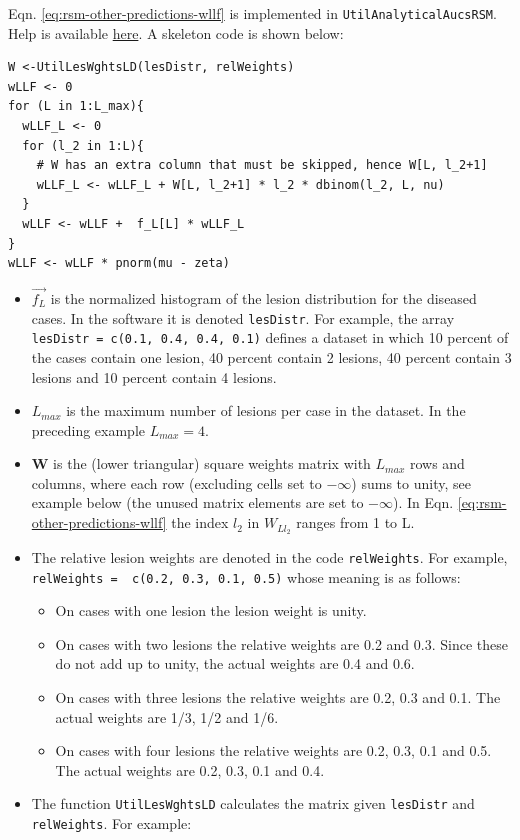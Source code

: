 \documentclass[
]{book}
\providecommand{\tightlist}{%
  \setlength{\itemsep}{0pt}\setlength{\parskip}{0pt}}
\begin{document}
Eqn. \eqref{eq:rsm-other-predictions-wllf} is implemented in \texttt{UtilAnalyticalAucsRSM}. Help is available \href{https://dpc10ster.github.io/RJafroc/reference/UtilAnalyticalAucsRSM.html}{here}. A skeleton code is shown below:

\begin{verbatim}
W <-UtilLesWghtsLD(lesDistr, relWeights)
wLLF <- 0
for (L in 1:L_max){
  wLLF_L <- 0
  for (l_2 in 1:L){
    # W has an extra column that must be skipped, hence W[L, l_2+1]
    wLLF_L <- wLLF_L + W[L, l_2+1] * l_2 * dbinom(l_2, L, nu)
  }
  wLLF <- wLLF +  f_L[L] * wLLF_L
}
wLLF <- wLLF * pnorm(mu - zeta)
\end{verbatim}

\begin{itemize}
\tightlist
\item
  \(\overrightarrow{f_L}\) is the normalized histogram of the lesion distribution for the diseased cases. In the software it is denoted \texttt{lesDistr}. For example, the array \texttt{lesDistr\ =\ c(0.1,\ 0.4,\ 0.4,\ 0.1)} defines a dataset in which 10 percent of the cases contain one lesion, 40 percent contain 2 lesions, 40 percent contain 3 lesions and 10 percent contain 4 lesions.
\item
  \(L_{max}\) is the maximum number of lesions per case in the dataset. In the preceding example \(L_{max} = 4\).
\item
  \(\mathbf{W}\) is the (lower triangular) square weights matrix with \(L_{max}\) rows and columns, where each row (excluding cells set to \(-\infty\)) sums to unity, see example below (the unused matrix elements are set to \(-\infty\)). In Eqn. \eqref{eq:rsm-other-predictions-wllf} the index \(l_2\) in \(W_{Ll_2}\) ranges from 1 to L.
\item
  The relative lesion weights are denoted in the code \texttt{relWeights}. For example, \texttt{relWeights\ =\ \ c(0.2,\ 0.3,\ 0.1,\ 0.5)} whose meaning is as follows:

  \begin{itemize}
  \tightlist
  \item
    On cases with one lesion the lesion weight is unity.
  \item
    On cases with two lesions the relative weights are 0.2 and 0.3. Since these do not add up to unity, the actual weights are 0.4 and 0.6.
  \item
    On cases with three lesions the relative weights are 0.2, 0.3 and 0.1. The actual weights are 1/3, 1/2 and 1/6.
  \item
    On cases with four lesions the relative weights are 0.2, 0.3, 0.1 and 0.5. The actual weights are 0.2, 0.3, 0.1 and 0.4.
  \end{itemize}
\item
  The function \texttt{UtilLesWghtsLD} calculates the matrix given \texttt{lesDistr} and \texttt{relWeights}. For example:
\end{itemize}
\end{document}
